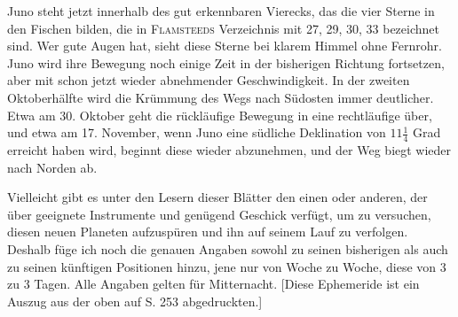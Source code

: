 Juno steht jetzt innerhalb des gut erkennbaren Vierecks, das die vier Sterne in den Fischen bilden, die in \textsc{Flamsteeds} Verzeichnis mit 27, 29, 30, 33 bezeichnet sind. Wer gute Augen hat, sieht diese Sterne bei klarem Himmel ohne Fernrohr. Juno wird ihre Bewegung noch einige Zeit in der bisherigen Richtung fortsetzen, aber mit schon jetzt wieder abnehmender Geschwindigkeit. In der zweiten Oktoberhälfte wird die Krümmung des Wegs nach Südosten immer deutlicher. Etwa am 30. Oktober geht die rückläufige Bewegung in eine rechtläufige über, und etwa am 17. November, wenn Juno eine südliche Deklination von $11\frac{1}{4}$ Grad erreicht haben wird, beginnt diese wieder abzunehmen, und der Weg biegt wieder nach Norden ab.

Vielleicht gibt es unter den Lesern dieser Blätter den einen oder anderen, der über geeignete Instrumente und genügend Geschick verfügt, um zu versuchen, diesen neuen Planeten aufzuspüren und ihn auf seinem Lauf zu verfolgen. Deshalb füge ich noch die genauen Angaben sowohl zu seinen bisherigen als auch zu seinen künftigen Positionen hinzu, jene nur von Woche zu Woche, diese von 3 zu 3 Tagen. Alle Angaben gelten für Mitternacht. [Diese Ephemeride ist ein Auszug aus der oben auf S. 253 abgedruckten.]

